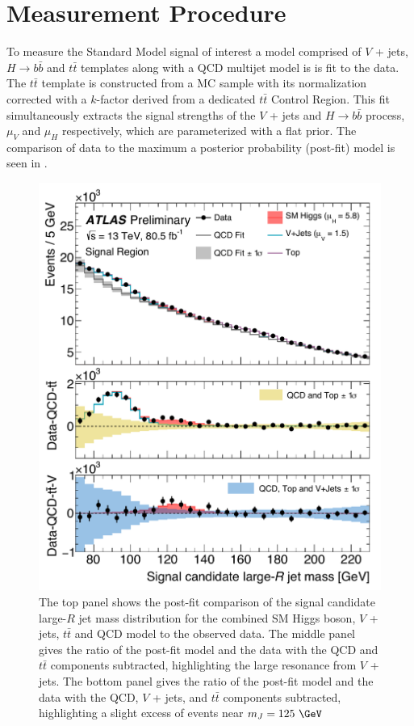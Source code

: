 \section{Measurement Procedure} \label{sec:results:procedure}

To measure the Standard Model signal of interest a model comprised of $V$ +
jets, $H \rightarrow b\bar{b}$ and $t\bar{t}$ templates along with a QCD
multijet model is is fit to the data. The $t\bar{t}$ template is constructed
from a MC sample with its normalization corrected with a $k$-factor derived
from a dedicated $t\bar{t}$ Control Region. This fit simultaneously extracts
the signal strengths of the $V$ + jets and $H \rightarrow b\bar{b}$ process,
$\mu_{V}$ and $\mu_{H}$ respectively, which are parameterized with a flat
prior. The comparison of data to the maximum a posterior probability (post-fit)
model is seen in .

\begin{figure}
\centering
\includegraphics[width=\linewidth]{figures/results/money_plot}
\caption{\cite{ATLAS-CONF-2018-052} 
The top panel shows the post-fit comparison of the signal candidate large-$R$
jet mass distribution for the combined SM Higgs boson, $V$ + jets, $t\bar{t}$
and QCD model to the observed data.  The middle panel gives the ratio of the
post-fit model and the data with the QCD and $t\bar{t}$ components subtracted,
highlighting the large resonance from $V$ + jets.  The bottom panel gives the
ratio of the post-fit model and the data with the QCD, $V$ + jets, and
$t\bar{t}$ components subtracted, highlighting a slight excess of events near
$m_{J} = 125~\GeV$}
\label{sec:results:money_plot}
\end{figure}


